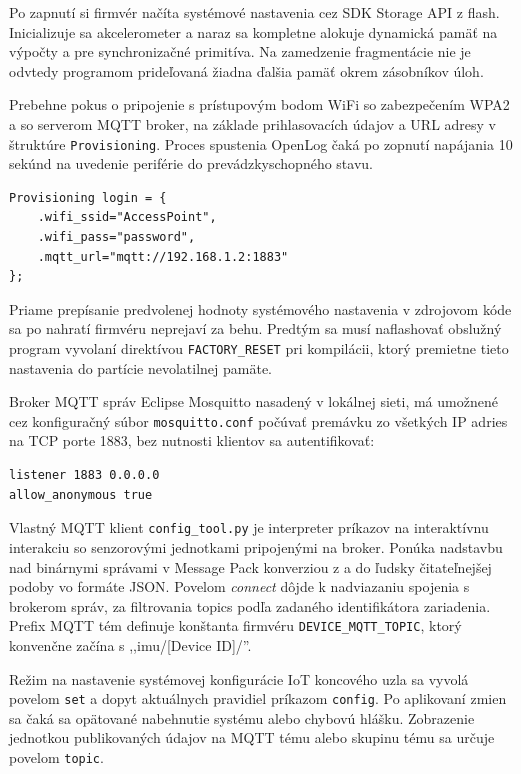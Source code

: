 Po zapnutí si firmvér načíta systémové nastavenia cez SDK Storage API z flash. Inicializuje sa
akcelerometer a naraz sa kompletne alokuje dynamická pamäť na výpočty a pre synchronizačné primitíva.
Na zamedzenie fragmentácie nie je odvtedy programom prideľovaná žiadna ďalšia pamäť okrem zásobníkov úloh.

Prebehne pokus o pripojenie s prístupovým bodom WiFi so zabezpečením WPA2 a so serverom MQTT broker, na základe prihlasovacích údajov
a URL adresy v štruktúre \verb|Provisioning|. Proces spustenia OpenLog čaká po zopnutí napájania 10 sekúnd na uvedenie
periférie do prevádzkyschopného stavu.
\begin{lstlisting}[style=implementation]
Provisioning login = {
    .wifi_ssid="AccessPoint",
    .wifi_pass="password",
    .mqtt_url="mqtt://192.168.1.2:1883"
};
\end{lstlisting}

Priame prepísanie predvolenej hodnoty systémového nastavenia v zdrojovom kóde
sa po nahratí firmvéru neprejaví za behu. Predtým sa musí naflashovať obslužný program vyvolaní direktívou
\verb|FACTORY_RESET| pri kompilácii, ktorý premietne tieto nastavenia do partície nevolatilnej pamäte.

Broker MQTT správ Eclipse Mosquitto nasadený v lokálnej sieti, má umožnené cez konfiguračný súbor \verb|mosquitto.conf| počúvať
premávku zo všetkých IP adries na TCP porte 1883, bez nutnosti klientov sa autentifikovať:
\begin{lstlisting}[style=implementation]
listener 1883 0.0.0.0
allow_anonymous true
\end{lstlisting}

Vlastný MQTT klient \verb|config_tool.py| je interpreter príkazov na interaktívnu interakciu so senzorovými jednotkami
pripojenými na broker. Ponúka nadstavbu nad binárnymi správami v Message Pack konverziou z a do ľudsky čitateľnejšej
podoby vo formáte JSON. Povelom \emph{connect} dôjde k nadviazaniu spojenia s brokerom správ, za filtrovania topics podľa
zadaného identifikátora zariadenia. Prefix MQTT tém definuje konštanta firmvéru \verb|DEVICE_MQTT_TOPIC|, ktorý konvenčne začína
s ,,imu/[Device ID]/''.

Režim na nastavenie systémovej konfigurácie IoT koncového uzla sa vyvolá povelom \verb|set| a dopyt aktuálnych pravidiel
príkazom \verb|config|. Po aplikovaní zmien sa čaká sa opätované nabehnutie systému alebo chybovú hlášku.
Zobrazenie jednotkou publikovaných údajov na MQTT tému alebo skupinu tému sa určuje povelom \verb|topic|.


